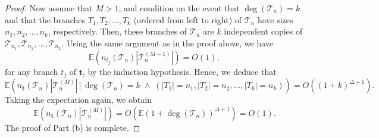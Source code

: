 \documentclass[article]{amsart}
\newcommand{\tc}{\mathcal{T}}
\newcommand{\st}{\textbf{t}}
\newcommand{\n}{n_{\st}}
\theoremstyle{definition}
\theoremstyle{remark}
\begin{document}
\begin{proof}
Now assume that $M > 1$, and condition on the event that $\deg(\tc_n) = k$ and that the branches $T_1, T_2, \dots, T_k$ (ordered from left to right) of $\tc_n$ have sizes $n_1, n_2, \dots, n_k$, respectively. Then, these branches of $\tc_n$ are $k$ independent copies of $\tc_{n_1}, \tc_{n_2}, \dots, \tc_{n_k}$. Using the same argument as in the proof above, we have
\[
\mathbb{E}(n_{t_j}(\tc_n) |\tc_n^{(M-1)}|) = O(1),
\]
for any branch $t_j$ of $\st$, by the induction hypothesis. Hence, we deduce that
\[
\mathbb{E} \left( \n(\tc_n) |\tc_n^{(M)}| \,\Big|\, \deg(\tc_n) = k \;\wedge\; (|T_1| = n_1, |T_2| = n_2, \dots, |T_k| = n_k) \right) = O((1 + k)^{\Delta + 1}).
\]
Taking the expectation again, we obtain
\[
\mathbb{E}(\n(\tc_n) |\tc_n^{(M)}|) = O \left( \mathbb{E}(1 + \deg(\tc_n))^{\Delta + 1} \right) = O(1).
\]
The proof of Part (b) is complete.




\end{proof}
\end{document}
